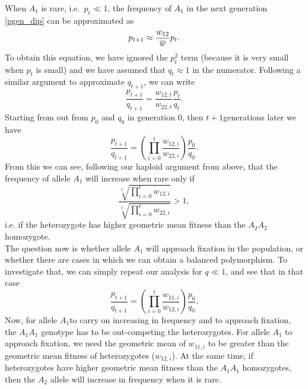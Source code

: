 When $A_1$ is rare, i.e.\ $p_t \ll 1$, the frequency of $A_1$ in the next
generation \eqref{pgen_dip} can be approximated as
\begin{equation}
p_{t+1} \approx \frac{w_{12}}{\overline{w}} p_t.
\end{equation}
To obtain this equation, we have ignored the $p_{t}^2$ term (because it is very small when $p_t$ is small) and we have assumed that $q_t \approx 1$ in the numerator.
Following a similar argument to approximate $q_{t+1}$, we can write
\begin{equation}
	\frac{p_{t+1}}{q_{t+1}} = \frac{w_{12,t}}{w_{22,t}}  \frac{p_{t}}{q_{t}}.
\end{equation}
Starting from out from $p_0$ and $q_0$ in generation $0$, then $t+1$generations later we have
\begin{equation}
	\frac{p_{t+1}}{q_{t+1}} = \left( \prod_{i=0}^{t} \frac{w_{12,i}}{w_{22,i}}  \right) \frac{p_{0}}{q_{0}}.
\end{equation}
From this we can see, following our haploid argument from above, that the frequency of allele $A_1$ will increase when rare only if
\begin{equation}
	\frac{\sqrt[t]{\prod_{i=0}^{t}w_{12,i}}}{\sqrt[t]{\prod_{i=0}^{t}w_{22,i}}}>1 \label{geometric_1wins},
\end{equation}
i.e. if the heterozygote has higher geometric mean fitness than the $A_2A_2$ homozygote.\\

The question now is whether allele $A_1$ will approach fixation in the population, or whether there are cases in which we can obtain a balanced polymorphism. To investigate that, we can simply repeat our analysis for $q \ll 1$, and see that in that case
\begin{equation}
	\frac{p_{t+1}}{q_{t+1}} = \left( \prod_{i=0}^{t} \frac{w_{11,i}}{w_{12,i}}  \right) \frac{p_{0}}{q_{0}}.
\end{equation}
Now, for allele $A_1$to carry on increasing in frequency and to approach fixation, the $A_1A_1$ genotype has to be out-competing the heterozygotes. For allele $A_1$ to approach fixation, we need the geometric mean of $w_{11,i}$ to be greater than the geometric mean fitness of heterozygotes ($w_{12,i}$).
At the same time, if heterozygotes have higher geometric mean fitness than the $A_1A_1$ homozygotes, then the $A_2$ allele will increase in frequency when it is rare. 

